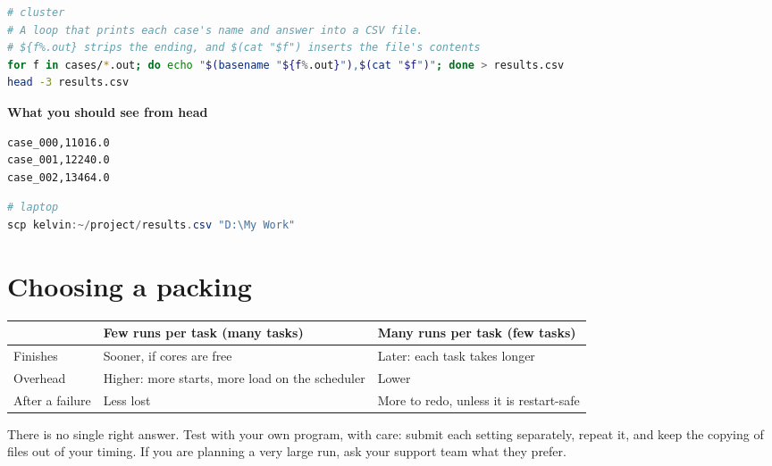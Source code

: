 \begin{lstlisting}[language=bash]
# cluster
# A loop that prints each case's name and answer into a CSV file.
# ${f%.out} strips the ending, and $(cat "$f") inserts the file's contents
for f in cases/*.out; do echo "$(basename "${f%.out}"),$(cat "$f")"; done > results.csv
head -3 results.csv
\end{lstlisting}

\textbf{What you should see from head}

\begin{lstlisting}[language=text]
case_000,11016.0
case_001,12240.0
case_002,13464.0
\end{lstlisting}

\begin{lstlisting}[language=powershell]
# laptop
scp kelvin:~/project/results.csv "D:\My Work"
\end{lstlisting}

\section{Choosing a packing}\label{choosing-a-packing}

{\def\LTcaptype{none} %
\begin{longtable}[]{@{}
  >{\raggedright\arraybackslash}p{}
  >{\raggedright\arraybackslash}p{}
  >{\raggedright\arraybackslash}p{}@{}}
\toprule\noalign{}
\begin{minipage}[b]{\linewidth}\raggedright
\end{minipage} & \begin{minipage}[b]{\linewidth}\raggedright
Few runs per task (many tasks)
\end{minipage} & \begin{minipage}[b]{\linewidth}\raggedright
Many runs per task (few tasks)
\end{minipage} \\
\midrule\noalign{}
\endhead
\bottomrule\noalign{}
\endlastfoot
Finishes & Sooner, if cores are free & Later: each task takes longer \\
Overhead & Higher: more starts, more load on the scheduler & Lower \\
After a failure & Less lost & More to redo, unless it is restart-safe \\
\end{longtable}
}

There is no single right answer. Test with your own program, with care: submit each setting separately, repeat it, and keep the copying of files out of your timing. If you are planning a very large run, ask your support team what they prefer.

